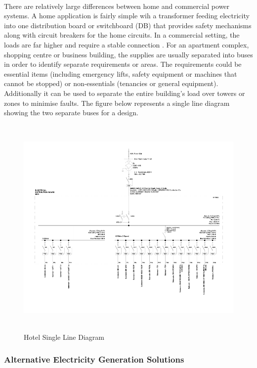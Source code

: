 \paragraph{}
There are relatively large differences between home and commercial power systems. A home application is fairly simple wih a transformer feeding electricity into one distribution board or switchboard (DB) that provides safety mechanisms along with circuit breakers for the home circuits. In a commercial setting, the loads are far higher and require a stable connection \cite{Baran2003}. For an apartment complex, shopping centre or business building, the supplies are usually separated into buses in order to identify separate requirements or areas. The requirements could be essential items (including emergency lifts, safety equipment or machines that cannot be stopped) or non-essentials (tenancies or general equipment). Additionally it can be used to separate the entire building's load over towers or zones to minimise faults. The figure below represents a single line diagram showing the two separate buses for a design. 

\begin{figure}[H]
\hfill\includegraphics[width = 160mm, height = 110mm]{images/PCad_SLD}\hspace*{\fill}
\caption{{Hotel Single Line Diagram}}
\label{fig:SLD}
\end{figure}       

\subsubsection{Alternative Electricity Generation Solutions}

